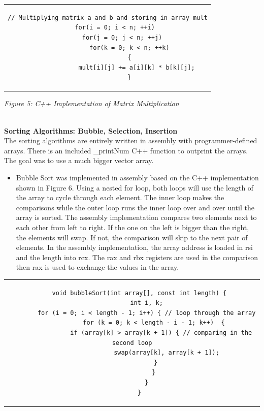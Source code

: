 \documentclass[twoside]{article}
\begin{document}
\begin{center} \begin{tabular}{c} \begin{lstlisting}
// Multiplying matrix a and b and storing in array mult
    for(i = 0; i < n; ++i)
        for(j = 0; j < n; ++j)
            for(k = 0; k < n; ++k)
            {
                mult[i][j] += a[i][k] * b[k][j];
            }
\end{lstlisting} \end{tabular} \end{center}
\begin{center}\textit{Figure 5: C++ Implementation of Matrix Multiplication}\end{center}

\noindent \\ \textbf{Sorting Algorithms: Bubble, Selection, Insertion}
\\The sorting algorithms are entirely written in assembly with programmer-defined arrays. There is an included \_printNum C++ function to outprint the arrays. The goal was to use a much bigger vector array.\\
\begin{itemize}
\item Bubble Sort was implemented in assembly based on the C++ implementation shown in Figure 6. Using a nested for loop, both loops will use the length of the array to cycle through each element. The inner loop makes the comparisons while the outer loop runs the inner loop over and over until the array is sorted. The assembly implementation compares two elements next to each other from left to right. If the one on the left is bigger than the right, the elements will swap. If not, the comparison will skip to the next pair of elements. In the assembly implementation, the array address is loaded in rsi and the length into rcx. The rax and rbx registers are used in the comparison then rax is used to exchange the values in the array. 
\end{itemize}
\begin{center} \begin{tabular}{c} \begin{lstlisting}
    void bubbleSort(int array[], const int length) {
        int i, k;
        for (i = 0; i < length - 1; i++) { // loop through the array
            for (k = 0; k < length - i - 1; k++)  {
                if (array[k] > array[k + 1]) { // comparing in the second loop
                    swap(array[k], array[k + 1]); 
                }   
            }
        }
    }
\end{lstlisting} \end{tabular} \end{center}
\end{document}
